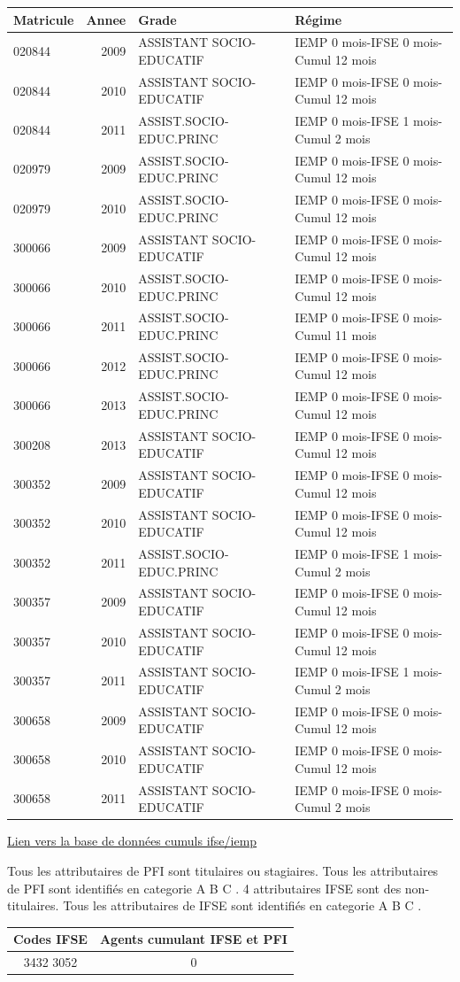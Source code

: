 \begin{longtable}[]{@{}lrll@{}}
\toprule
Matricule & Annee & Grade & Régime\tabularnewline
\midrule
\endhead
020844 & 2009 & ASSISTANT SOCIO-EDUCATIF & IEMP 0 mois-IFSE 0 mois-Cumul
12 mois\tabularnewline
020844 & 2010 & ASSISTANT SOCIO-EDUCATIF & IEMP 0 mois-IFSE 0 mois-Cumul
12 mois\tabularnewline
020844 & 2011 & ASSIST.SOCIO-EDUC.PRINC & IEMP 0 mois-IFSE 1 mois-Cumul
2 mois\tabularnewline
020979 & 2009 & ASSIST.SOCIO-EDUC.PRINC & IEMP 0 mois-IFSE 0 mois-Cumul
12 mois\tabularnewline
020979 & 2010 & ASSIST.SOCIO-EDUC.PRINC & IEMP 0 mois-IFSE 0 mois-Cumul
12 mois\tabularnewline
300066 & 2009 & ASSISTANT SOCIO-EDUCATIF & IEMP 0 mois-IFSE 0 mois-Cumul
12 mois\tabularnewline
300066 & 2010 & ASSIST.SOCIO-EDUC.PRINC & IEMP 0 mois-IFSE 0 mois-Cumul
12 mois\tabularnewline
300066 & 2011 & ASSIST.SOCIO-EDUC.PRINC & IEMP 0 mois-IFSE 0 mois-Cumul
11 mois\tabularnewline
300066 & 2012 & ASSIST.SOCIO-EDUC.PRINC & IEMP 0 mois-IFSE 0 mois-Cumul
12 mois\tabularnewline
300066 & 2013 & ASSIST.SOCIO-EDUC.PRINC & IEMP 0 mois-IFSE 0 mois-Cumul
12 mois\tabularnewline
300208 & 2013 & ASSISTANT SOCIO-EDUCATIF & IEMP 0 mois-IFSE 0 mois-Cumul
12 mois\tabularnewline
300352 & 2009 & ASSISTANT SOCIO-EDUCATIF & IEMP 0 mois-IFSE 0 mois-Cumul
12 mois\tabularnewline
300352 & 2010 & ASSISTANT SOCIO-EDUCATIF & IEMP 0 mois-IFSE 0 mois-Cumul
12 mois\tabularnewline
300352 & 2011 & ASSIST.SOCIO-EDUC.PRINC & IEMP 0 mois-IFSE 1 mois-Cumul
2 mois\tabularnewline
300357 & 2009 & ASSISTANT SOCIO-EDUCATIF & IEMP 0 mois-IFSE 0 mois-Cumul
12 mois\tabularnewline
300357 & 2010 & ASSISTANT SOCIO-EDUCATIF & IEMP 0 mois-IFSE 0 mois-Cumul
12 mois\tabularnewline
300357 & 2011 & ASSISTANT SOCIO-EDUCATIF & IEMP 0 mois-IFSE 1 mois-Cumul
2 mois\tabularnewline
300658 & 2009 & ASSISTANT SOCIO-EDUCATIF & IEMP 0 mois-IFSE 0 mois-Cumul
12 mois\tabularnewline
300658 & 2010 & ASSISTANT SOCIO-EDUCATIF & IEMP 0 mois-IFSE 0 mois-Cumul
12 mois\tabularnewline
300658 & 2011 & ASSISTANT SOCIO-EDUCATIF & IEMP 0 mois-IFSE 0 mois-Cumul
2 mois\tabularnewline
\bottomrule
\end{longtable}

\href{../Bases/Reglementation/personnels.ifse.iemp.csv}{Lien vers la base
de données cumuls ifse/iemp}

Tous les attributaires de PFI sont titulaires ou stagiaires. Tous les
attributaires de PFI sont identifiés en categorie A B C . 4
attributaires IFSE sont des non-titulaires. Tous les attributaires de
IFSE sont identifiés en categorie A B C .

\begin{longtable}[]{@{}cc@{}}
\toprule
Codes IFSE & Agents cumulant IFSE et PFI\tabularnewline
\midrule
\endhead
3432 3052 & 0\tabularnewline
\bottomrule
\end{longtable}

